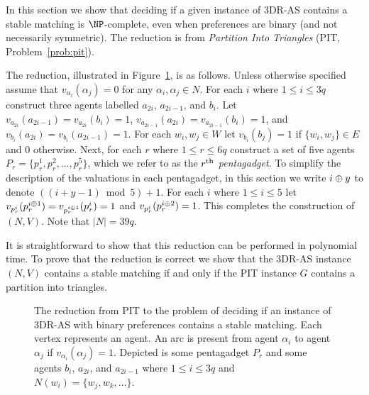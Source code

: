 In this section we show that deciding if a given instance of 3DR-AS contains a stable matching is $\NP$-complete, even when preferences are binary (and not necessarily symmetric). The reduction is from \emph{Partition Into Triangles} (PIT, Problem~\ref{prob:pit}).

The reduction, illustrated in Figure~\ref{fig:threed_sr_as_binary_reduction}, is as follows. Unless otherwise specified assume that $v_{\alpha_i}(\alpha_j)=0$ for any $\alpha_i, \alpha_j \in N$. For each $i$ where $1 \leq i \leq 3q$ construct three agents labelled $a_{2i}$, $a_{2i-1}$, and $b_i$. Let $v_{a_{2i}}(a_{2i-1})=v_{a_{2i}}(b_i)=1$, $v_{a_{2i-1}}(a_{2i})=v_{a_{2i-1}}(b_i)=1$, and $v_{b_i}(a_{2i})=v_{b_i}(a_{2i-1})=1$. For each $w_i, w_j \in W$ let  $v_{b_i}(b_j)=1$ if $\{ w_i, w_j \} \in E$ and $0$ otherwise. Next, for each $r$ where $1 \leq r \leq 6q$ construct a set of five agents $P_r = \{ p_r^1, p_r^2, \dots, p_r^5 \}$, which we refer to as the \emph{$r\textsuperscript{th}$ pentagadget}. To simplify the description of the valuations in each pentagadget, in this section we write $i \oplus y$ to denote $((i + y - 1) \bmod 5) + 1$. For each $i$ where $1\leq i \leq 5$ let $v_{p_r^i}(p_r^{i \oplus 1}) = v_{p_r^{i \oplus 1}}(p_r^i) = 1$ and $v_{p_r^i}(p_r^{i \oplus 2}) = 1$.
This completes the construction of $(N, V)$. Note that $|N|=39q$.

It is straightforward to show that this reduction can be performed in polynomial time. To prove that the reduction is correct we show that the 3DR-AS instance $(N, V)$ contains a stable matching if and only if the PIT instance $G$ contains a partition into triangles.

\begin{figure}
  \centering
    
    \caption[The reduction from PIT to the problem of deciding if an instance of 3DR-AS with binary preferences contains a stable matching]{The reduction from PIT to the problem of deciding if an instance of 3DR-AS with binary preferences contains a stable matching. Each vertex represents an agent. An arc is present from agent $\alpha_i$ to agent $\alpha_j$ if $v_{\alpha_i}(\alpha_j) = 1$. Depicted is some pentagadget $P_r$ and some agents $b_i$, $a_{2i}$, and $a_{2i - 1}$ where $1\leq i \leq 3q$ and $N(w_i) = \{ w_j, w_k, \dots \}$.}
    \label{fig:threed_sr_as_binary_reduction}
\end{figure}

